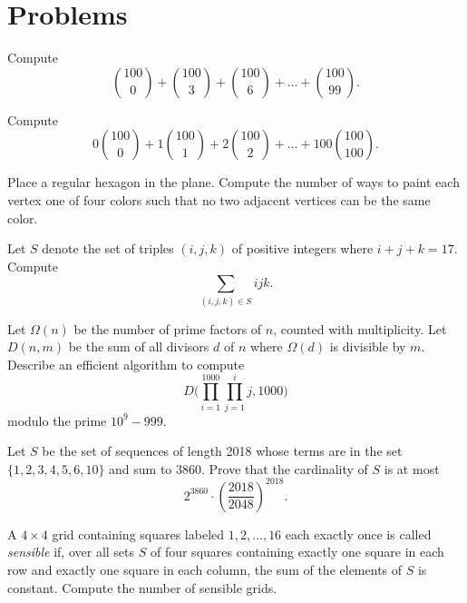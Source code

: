 \documentclass[11pt]{scrartcl}
\begin{document}
\section{Problems}

\begin{problem}
    Compute
    \[\binom{100}0 + \binom{100}3 + \binom{100}6 + \dots + \binom{100}{99}.\]
\end{problem}

\begin{problem}
    Compute
    \[0\binom{100}0 + 1\binom{100}1 + 2\binom{100}2 + \dots + 100\binom{100}{100}.\]
\end{problem}

\begin{problem}[AIME II 2016/12]
    Place a regular hexagon in the plane. Compute the number of ways to paint each vertex one of four colors such that no two adjacent vertices can be the same color.
\end{problem}

\begin{problem}[HMMT 2007/C9]
    Let $S$ denote the set of triples $(i,j,k)$ of positive integers where $i + j + k = 17$. Compute
    \[\sum_{(i,j,k) \in S}ijk.\]
\end{problem}

\begin{problem}
    Let $\Omega(n)$ be the number of prime factors of $n$, counted with multiplicity. Let $D(n,m)$ be the sum of all divisors $d$ of $n$ where $\Omega(d)$ is divisible by $m$. Describe an efficient algorithm to compute
	\[D\biggl(\prod_{i = 1}^{1000}\prod_{j = 1}^i j,1000\biggr)\]
	modulo the prime $10^9 - 999$.
\end{problem}

\begin{problem}[Putnam 2018/B6]
    Let $S$ be the set of sequences of length 2018 whose terms are in the set $\{1, 2, 3, 4, 5, 6, 10\}$ and sum to 3860. Prove that the cardinality of $S$ is at most
    \[2^{3860} \cdot \left(\frac{2018}{2048}\right)^{2018}.\]
\end{problem}

\begin{problem}
    A $4 \times 4$ grid containing squares labeled $1,2,\dots,16$ each exactly once is called \emph{sensible} if, over all sets $S$ of four squares containing exactly one square in each row and exactly one square in each column, the sum of the elements of $S$ is constant. Compute the number of sensible grids.
\end{problem}
\end{document}
